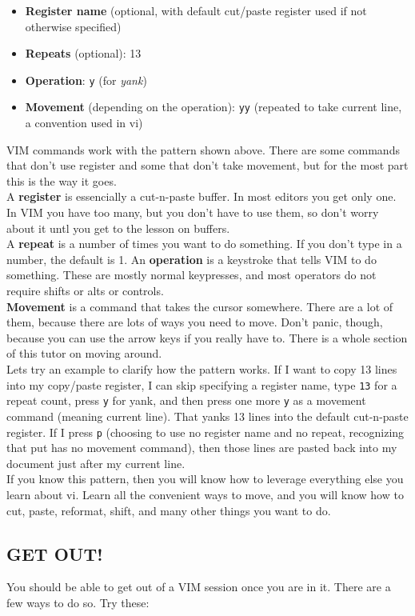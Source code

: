 \documentclass[a4paper, 12pt]{article}
\begin{document}
\begin{itemize}
\item {\bf Register name} (optional, with default cut/paste register used if not otherwise specified)
\item {\bf Repeats} (optional): 13
\item {\bf Operation}: {\tt y} (for {\it yank})
\item {\bf Movement} (depending on the operation): {\tt yy} (repeated to take current line, a convention used in vi)
\end{itemize}

VIM commands work with the pattern shown above. There are some commands that don't use register and some that don't take movement, but for the most part this is the way it goes.\\
A {\bf register} is essencially a cut-n-paste buffer. In most editors you get only one. In VIM you have too many, but you don't have to use them, so don't worry about it untl you get to the lesson on buffers.\\
A {\bf repeat} is a number of times you want to do something. If you don't type in a number, the default is 1.
An {\bf operation} is a keystroke that tells VIM to do something. These are mostly normal keypresses, and most operators do not require shifts or alts or controls.\\
{\bf Movement} is a command that takes the cursor somewhere. There are a lot of them, because there are lots of ways you need to move. Don't panic, though, because you can use the arrow keys if you really have to. There is a whole section of this tutor on moving around.\\
Lets try an example to clarify how the pattern works. If I want to copy 13 lines into my copy/paste register, I can skip specifying a register name, type {\tt 13} for a repeat count, press {\tt y} for yank, and then press one more {\tt y} as a movement command (meaning current line). That yanks 13 lines into the default cut-n-paste register. If I press {\tt p} (choosing to use no register name and no repeat, recognizing that put has no movement command), then those lines are pasted back into my document just after my current line.\\
If you know this pattern, then you will know how to leverage everything else you learn about vi. Learn all the convenient ways to move, and you will know how to cut, paste, reformat, shift, and many other things you want to do.
\subsection{GET OUT!}
\label{"GET OUT!"}
You should be able to get out of a VIM session once you are in it. There are a few ways to do so. Try these: 
\end{document}
